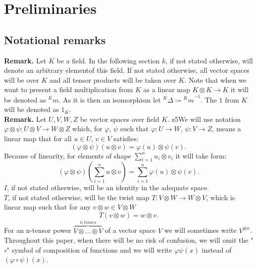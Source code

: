 \documentclass[a4paper, 12pt]{report}
\begin{document}
\section{Preliminaries}

\subsection{Notational remarks}
\indent \textbf{Remark. }Let $K$ be a field. In the following section $k$, if not stated otherwise, will
denote an arbitrary elementof this field. If not stated otherwise, all vector spaces will be over $K$
and all tensor products will be taken over $K$. Note that when we want to present a field
multiplication from $K$ as a linear map $K \otimes K \to K$ it will be denoted as ${^Km}$. As it is then an
isomorphism let ${^K\Delta} \coloneqq {^Km}^{-1}$. The $1$ from $K$ will be denoted as $1_K$.\\[8pt]
\textbf{Remark. } Let $U, V, W, Z$ be vector spaces over field $K$.
z5We will use notation
$\varphi \otimes \psi:U \otimes V \to W \otimes Z$ which, for
$\varphi$, $\psi$ such that $\varphi : U \to W$, $\psi : V \to Z$, means a linear map that
for all $u \in U$, $v \in V$ satisfies:
\begin{equation*}
(\varphi \otimes \psi)(u \otimes v) = \varphi(u) \otimes \psi(v).
\end{equation*}
Because of linearity, for elements of shape $\displaystyle\sum^n_{i=1} u_i \otimes v_i$ it will take form:
\begin{equation*}
(\varphi \otimes \psi)(\sum^n_{i = 1} u \otimes v) = \sum^n_{i = 1}\varphi(u) \otimes \psi(v).
\end{equation*}
$I$, if not stated otherwise, will be an identity in the adequate space. \\
$T$, if not stated otherwise, will
be the twist map $T:V \otimes W \to W\otimes V$, which is linear map such that for any $v \otimes w
\in V \otimes W$
\begin{equation*}
T(v \otimes w) = w\otimes v.
\end{equation*}
For an n-tensor power $\overbrace{V \otimes \dots \otimes V}^{n\ times}$  of a vector space $V$ we will
sometimes write $V^{\otimes n}$.\\
Throughout this paper, when there will be no risk
of confusion, we will omit the "$\circ$" symbol of composition of functions and we will write
$\varphi \psi (x)$ instead of $(\varphi \circ \psi)(x)$.
\end{document}
